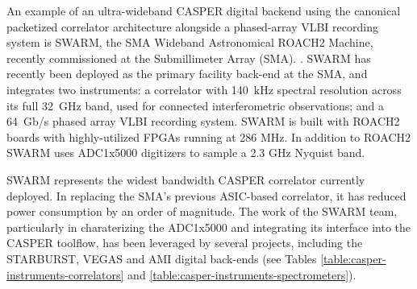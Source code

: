 \documentclass{ws-jai}
\begin{document}
An example of an ultra-wideband CASPER digital backend using the canonical packetized correlator architecture alongside a phased-array VLBI recording system is SWARM, the SMA Wideband Astronomical ROACH2 Machine, recently commissioned at the Submillimeter Array (SMA). \citep{swarm}. SWARM has recently been deployed as the primary facility back-end at the SMA, and integrates two instruments: a correlator with 140~kHz spectral resolution across its full 32~GHz band, used for connected interferometric observations; and a 64~Gb/s phased array VLBI recording system. SWARM is built with ROACH2 boards with highly-utilized FPGAs running at 286 MHz. In addition to ROACH2 SWARM uses ADC1x5000 digitizers to sample a 2.3 GHz Nyquist band.

SWARM represents the widest bandwidth CASPER correlator currently deployed. In replacing the SMA's previous ASIC-based correlator, it has reduced power consumption by an order of magnitude. The work of the SWARM team, particularly in charaterizing the ADC1x5000 \citep{adc5g} and integrating its interface into the CASPER toolflow, has been leveraged by several projects, including the STARBURST, VEGAS and AMI digital back-ends (see Tables \ref{table:casper-instruments-correlators} and \ref{table:casper-instruments-spectrometers}).
\end{document}
